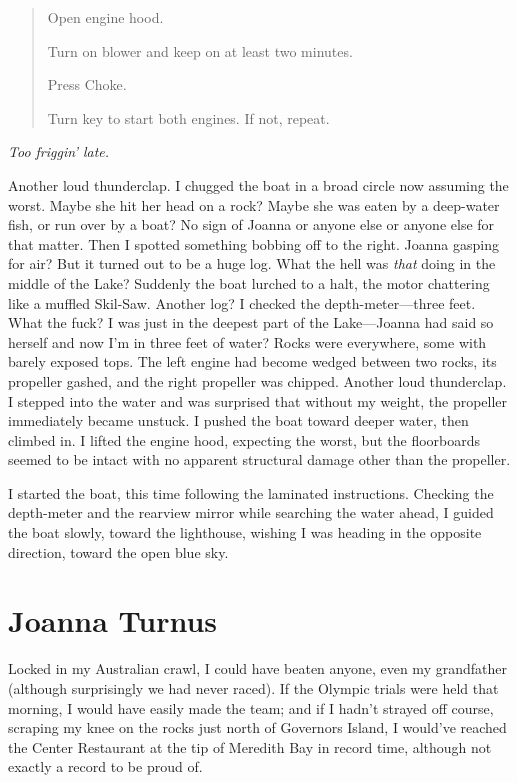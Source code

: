 \begin{quote}
Open engine hood.

Turn on blower and keep on at least two minutes.

Press Choke.

Turn key to start both engines. If not, repeat.
\end{quote}

\emph{Too friggin' late.}

Another loud thunderclap. I chugged the boat in a broad circle now
assuming the worst. Maybe she hit her head on a rock? Maybe she was
eaten by a deep-water fish, or run over by a boat? No sign of Joanna or
anyone else or anyone else for that matter. Then I spotted something
bobbing off to the right. Joanna gasping for air? But it turned out to
be a huge log. What the hell was \emph{that} doing in the middle of the
Lake? Suddenly the boat lurched to a halt, the motor chattering like a
muffled Skil-Saw. Another log? I checked the depth-meter---three feet.
What the fuck? I was just in the deepest part of the Lake---Joanna had
said so herself and now I'm in three feet of water? Rocks were
everywhere, some with barely exposed tops. The left engine had become
wedged between two rocks, its propeller gashed, and the right propeller
was chipped. Another loud thunderclap. I stepped into the water and was
surprised that without my weight, the propeller immediately became
unstuck. I pushed the boat toward deeper water, then climbed in. I
lifted the engine hood, expecting the worst, but the floorboards seemed
to be intact with no apparent structural damage other than the
propeller.

I started the boat, this time following the laminated instructions.
Checking the depth-meter and the rearview mirror while searching the
water ahead, I guided the boat slowly, toward the lighthouse, wishing I
was heading in the opposite direction, toward the open blue sky.

\chapter{Joanna Turnus}

\titlemark

Locked in my Australian crawl, I could have beaten anyone, even my
grandfather (although surprisingly we had never raced). If the Olympic
trials were held that morning, I would have easily made the team; and if
I hadn't strayed off course, scraping my knee on the rocks just north of
Governors Island, I would've reached the Center Restaurant at the tip of
Meredith Bay in record time, although not exactly a record to be proud
of.

